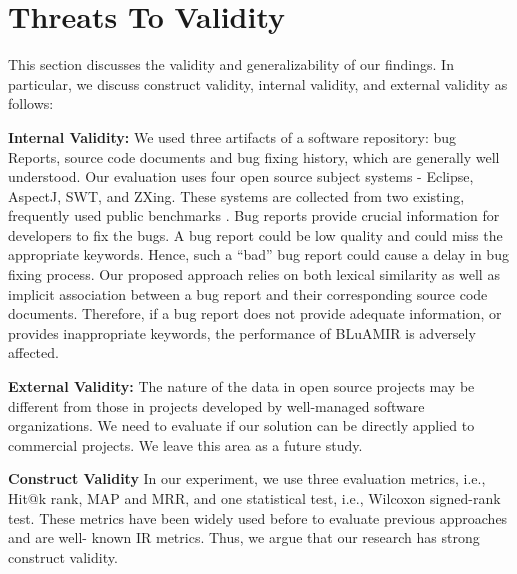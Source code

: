 \documentclass[conference]{IEEEtran}
\begin{document}


\section{Threats To Validity}\label{sec:threats}
This section discusses the validity and generalizability of our findings. In particular, we discuss construct validity, internal validity, and external validity as follows:

\textbf{Internal Validity:} We used three artifacts of a software repository: bug Reports, source code documents and bug fixing history, which are generally well understood. Our evaluation uses four open source subject systems - Eclipse, AspectJ, SWT, and ZXing. These systems are collected from two existing, frequently used public benchmarks \cite{Jian, Saha}. 
Bug reports provide crucial information for developers to fix the bugs.
A bug report could be low quality and could miss the appropriate keywords.
Hence, such a “bad” bug report could cause a delay in bug fixing process. Our proposed approach relies on both lexical similarity as well as implicit association between a bug report and their corresponding source code documents. Therefore, if a bug report does not provide adequate information, or provides inappropriate keywords, the performance of BLuAMIR is adversely affected.

\textbf{External Validity:} 
The nature of the data in open source projects may be different from those in projects developed by well-managed software organizations. We need to evaluate if our solution can be directly applied to commercial projects. We leave this area as a future study. 

\textbf{Construct Validity}
In our experiment, we use three evaluation metrics, i.e., Hit@k rank, MAP and MRR, and one statistical test, i.e., Wilcoxon signed-rank test. These metrics have been widely used before to evaluate previous approaches \cite{Jian, Saha} and are well- known IR metrics. Thus, we argue that our research has strong construct validity.
\end{document}
